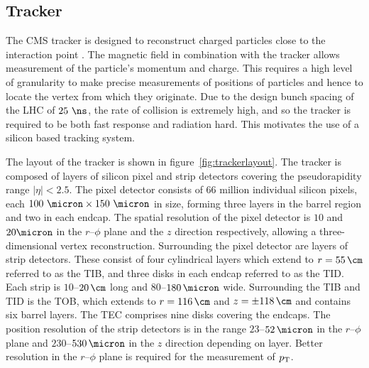 

\subsection{Tracker}
\label{sec:tracker}

The CMS tracker is designed to reconstruct charged particles close to the
interaction point \cite{Chatrchyan:2008aa}. The magnetic field in combination with the tracker allows
measurement of the particle's momentum and charge. This requires a high level of
granularity to make precise measurements of positions of particles and hence to
locate the vertex from which they originate. Due to the design bunch spacing
of the LHC of $25~\ns$, the rate of collision is extremely high, and so the tracker is
required to be both fast response and radiation hard. This motivates the use of a
silicon based tracking system.

The layout of the tracker is shown in figure~\ref{fig:trackerlayout}.
The tracker is composed of layers of silicon pixel and strip detectors covering
the pseudorapidity range $|\eta| < 2.5$. The pixel detector consists of 66
million individual silicon pixels, each $100~\micron \times 150~\micron$
in size, forming three layers in the barrel region and two in each endcap. The
spatial resolution of the pixel detector is $10$ and $20\micron$ in the $r$--$\phi$ plane
and the $z$ direction respectively, allowing a three-dimensional vertex reconstruction.
Surrounding the pixel detector are layers of strip detectors. These consist of
four cylindrical layers which extend to $r=55\,\cm$ referred to as the
\ac{TIB}, and three disks in each endcap referred to as the \ac{TID}. Each strip
is $10$--$20\,\cm$ long and $80$--$180\,\micron$ wide. Surrounding the \ac{TIB}
and \ac{TID} is the \ac{TOB}, which extends to $r=116\,\cm$ and
$z=\pm118\,\cm$ and contains six barrel layers. The \ac{TEC} comprises nine
disks covering the endcaps. The position resolution of the strip detectors is in
the range $23$--$52\,\micron$ in the $r$--$\phi$ plane and $230$--$530\,\micron$
in the $z$ direction depending on layer. Better resolution in the $r$--$\phi$
plane is required for the measurement of $p_{\mathrm{T}}$.

